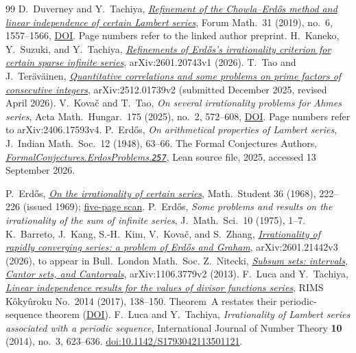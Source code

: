 \documentclass[11pt]{article}
\begin{document}
\begingroup\small
\begin{thebibliography}{99}
 D.~Duverney and Y.~Tachiya,
  \href{https://danielduverney.fr/documents/theorie-des-nombres/DuverneyTachiya190522.pdf}
  {\emph{Refinement of the Chowla--Erd\H{o}s method and linear independence
  of certain Lambert series}},
  Forum Math.\ 31 (2019), no.~6, 1557--1566,
  \href{https://doi.org/10.1515/forum-2018-0299}{DOI}.  Page numbers refer to
  the linked author preprint.
 H.~Kaneko, Y.~Suzuki, and Y.~Tachiya,
  \href{https://arxiv.org/abs/2601.20743v1}{\emph{Refinements of Erd\H{o}s's
  irrationality criterion for certain sparse infinite series}},
  arXiv:2601.20743v1 (2026).
 T.~Tao and J.~Ter\"av\"ainen,
  \href{https://arxiv.org/abs/2512.01739v2}{\emph{Quantitative correlations and
  some problems on prime factors of consecutive integers}}, arXiv:2512.01739v2
  (submitted December 2025, revised April 2026).
 V.~Kova\v{c} and T.~Tao, \emph{On several irrationality
  problems for Ahmes series}, Acta Math.\ Hungar.\ 175 (2025), no.~2, 572--608,
  \href{https://doi.org/10.1007/s10474-025-01528-0}{DOI}.  Page numbers refer
  to arXiv:2406.17593v4.
 P.~Erd\H{o}s, \emph{On arithmetical properties of Lambert
  series}, J.~Indian Math.\ Soc.\ 12 (1948), 63--66.
 The Formal Conjectures Authors,
  \href{https://github.com/google-deepmind/formal-conjectures/blob/f776d2f2039351b00737ffcafb9d7d7666e1d9af/FormalConjectures/ErdosProblems/257.lean}
  {\emph{FormalConjectures.ErdosProblems.\texttt{257}}},
  Lean source file, 2025, accessed 13 September 2026.

 P.~Erd\H{o}s,
  \href{https://users.renyi.hu/~p_erdos/1969-09.pdf}{\emph{On the
  irrationality of certain series}}, Math.\ Student 36 (1968), 222--226
  (issued 1969); \href{https://www.renyi.hu/~p_erdos/1969-09.pdf}{five-page scan}.
 P.~Erd\H{o}s, \emph{Some problems and results on the
  irrationality of the sum of infinite series}, J.~Math.\ Sci.\ 10 (1975),
  1--7.
 K.~Barreto, J.~Kang, S.-H.~Kim, V.~Kova\v{c}, and
  S.~Zhang, \href{https://arxiv.org/abs/2601.21442v3}{\emph{Irrationality of
  rapidly converging series: a problem of Erd\H{o}s and Graham}},
  arXiv:2601.21442v3 (2026), to appear in Bull.\ London Math.\ Soc.
 Z.~Nitecki,
  \href{https://arxiv.org/abs/1106.3779v2}{\emph{Subsum sets: intervals, Cantor
  sets, and Cantorvals}}, arXiv:1106.3779v2 (2013).
 F.~Luca and Y.~Tachiya,
  \href{https://www.kurims.kyoto-u.ac.jp/~kyodo/kokyuroku/contents/pdf/2014-14.pdf}
  {\emph{Linear independence results for the values of divisor functions
  series}}, RIMS K\^oky\^uroku No.~2014 (2017), 138--150.
  Theorem~A restates their periodic-sequence theorem
  (\href{https://doi.org/10.1142/S1793042113501121}{DOI}).
F.~Luca and Y.~Tachiya,
\emph{Irrationality of Lambert series associated with a periodic sequence},
International Journal of Number Theory \textbf{10} (2014), no.~3, 623--636.
\href{https://doi.org/10.1142/S1793042113501121}{doi:10.1142/S1793042113501121}.


\end{thebibliography}
\end{document}
